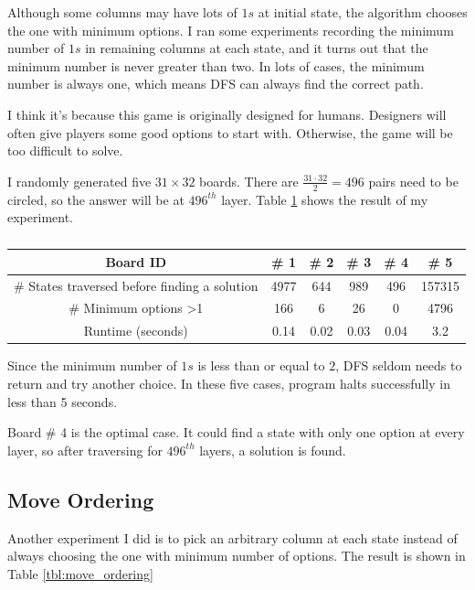 \documentclass[12pt]{article}
\begin{document}
Although some columns may have lots of $1s$ at initial state, the algorithm chooses the one with minimum options. I ran some experiments recording the minimum number of $1s$ in remaining columns at each state, and it turns out that the minimum number is never greater than two. In lots of cases, the minimum number is always one, which means DFS can always find the correct path.

I think it's because this game is originally designed for humans. Designers will often give players some good options to start with. Otherwise, the game will be too difficult to solve.

I randomly generated five $31\times 32$ boards. There are $\frac{31\cdot 32}{2}=496$ pairs need to be circled, so the answer will be at $496^{th}$ layer. Table \ref{tbl:branch_factor} shows the result of my experiment. 

\begin{table}[H]
	\centering
	\begin{tabular}{|c|c|c|c|c|c|}
	\hline
	Board ID                                      & \# 1   &\# 2   &\# 3   &\# 4   &\# 5      \\ \hline
	\# States traversed before finding a solution & 4977 & 644  & 989  & 496  & 157315 \\ \hline
	\# Minimum options \textgreater1              & 166  & 6    & 26   & 0    & 4796   \\ \hline
	Runtime (seconds)                             & 0.14 & 0.02 & 0.03 & 0.04 & 3.2    \\ \hline
	\end{tabular}	
	\caption{}
	\label{tbl:branch_factor}
\end{table}

Since the minimum number of $1s$ is less than or equal to $2$, DFS seldom needs to return and try another choice. In these five cases, program halts successfully in less than 5 seconds.

Board \# 4 is the optimal case. It could find a state with only one option at every layer, so after traversing for $496^{th}$ layers, a solution is found.

\subsection*{Move Ordering}
Another experiment I did is to pick an arbitrary column at each state instead of always choosing the one with minimum number of options. The result is shown in Table \ref{tbl:move_ordering}
\end{document}
